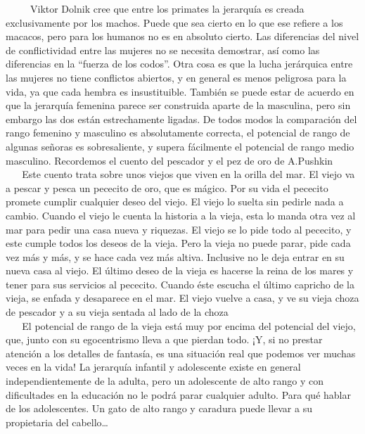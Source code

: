 ~ ~ ~ Viktor Dolnik cree que entre los primates la jerarquía es creada
exclusivamente por los machos. Puede que sea cierto en lo que ese
refiere a los macacos, pero para los humanos no es en absoluto cierto.
Las diferencias del nivel de conflictividad entre las mujeres no se
necesita demostrar, así como las diferencias en la ``fuerza de los
codos''. Otra cosa es que la lucha jerárquica entre las mujeres no tiene
conflictos abiertos, y en general es menos peligrosa para la vida, ya
que cada hembra es insustituible. También se puede estar de acuerdo en
que la jerarquía femenina parece ser construida aparte de la masculina,
pero sin embargo las dos están estrechamente ligadas. De todos modos la
comparación del rango femenino y masculino es absolutamente correcta, el
potencial de rango de algunas señoras es sobresaliente, y supera
fácilmente el potencial de rango medio masculino. Recordemos el cuento
del pescador y el pez de oro de A.Pushkin\\
\hspace*{0.333em} ~ ~ Este cuento trata sobre unos viejos que viven en
la orilla del mar. El viejo va a pescar y pesca un pececito de oro, que
es mágico. Por su vida el pececito promete cumplir cualquier deseo del
viejo. El viejo lo suelta sin pedirle nada a cambio. Cuando el viejo le
cuenta la historia a la vieja, esta lo manda otra vez al mar para pedir
una casa nueva y riquezas. El viejo se lo pide todo al pececito, y este
cumple todos los deseos de la vieja. Pero la vieja no puede parar, pide
cada vez más y más, y se hace cada vez más altiva. Inclusive no le deja
entrar en su nueva casa al viejo. El último deseo de la vieja es hacerse
la reina de los mares y tener para sus servicios al pececito. Cuando
éste escucha el último capricho de la vieja, se enfada y desaparece en
el mar. El viejo vuelve a casa, y ve su vieja choza de pescador y a su
vieja sentada al lado de la choza\\
\hspace*{0.333em} ~ ~ El potencial de rango de la vieja está muy por
encima del potencial del viejo, que, junto con su egocentrismo lleva a
que pierdan todo. ¡Y, si no prestar atención a los detalles de fantasía,
es una situación real que podemos ver muchas veces en la vida! La
jerarquía infantil y adolescente existe en general independientemente de
la adulta, pero un adolescente de alto rango y con dificultades en la
educación no le podrá parar cualquier adulto. Para qué hablar de los
adolescentes. Un gato de alto rango y caradura puede llevar a su
propietaria del cabello\ldots{}

